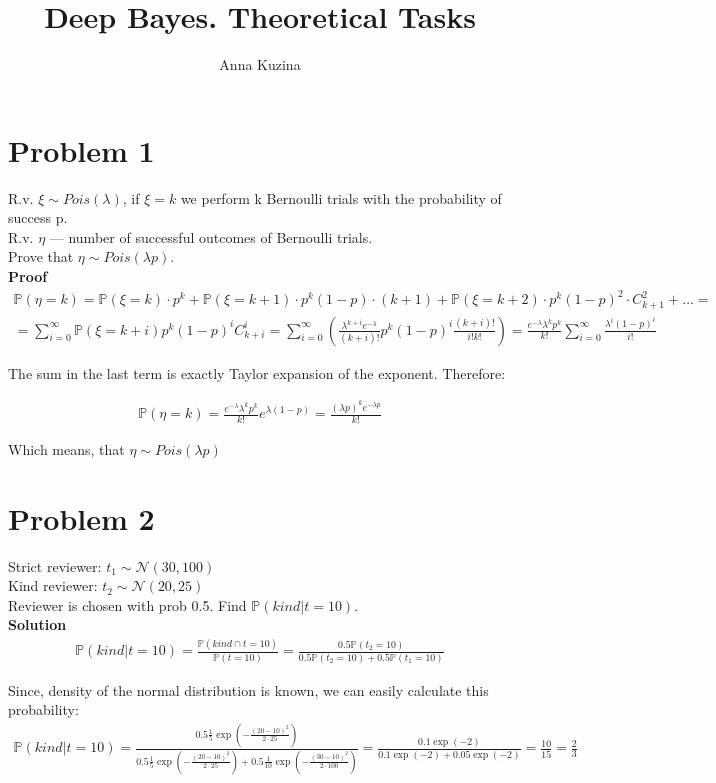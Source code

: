 \documentclass[]{article}
\title{Deep Bayes. Theoretical Tasks}
\author{Anna Kuzina}
\begin{document}
\maketitle



\section*{Problem 1}
R.v. $\xi \sim Pois(\lambda)$, if $\xi = k $ we perform k Bernoulli trials with the probability of success p. \\
R.v. $\eta$ ---  number of successful outcomes of Bernoulli trials.\\
Prove that $\eta \sim Pois(\lambda p)$.\\

\textbf{Proof}\\
\begin{align*}
\mathbb{P}(\eta = k) = \mathbb{P}(\xi = k)\cdot p^k + \mathbb{P}(\xi = k+1)\cdot p^{k}(1-p)\cdot (k+1) + \mathbb{P}(\xi = k+2)\cdot  p^{k}(1-p)^2\cdot C_{k+1}^2 + \dots =\\
=\sum_{i=0}^{\infty} \mathbb{P}(\xi = k+i) p^k (1-p)^{i}  C_{k+i}^i = 
\sum_{i=0}^{\infty}\left(   \frac{\lambda^{k+i}e^{-\lambda}}{(k+i)!}  p^k  (1-p)^{i}  \frac{(k+i)!}{i! k!}  \right)= 
\frac{e^{-\lambda}\lambda^k p^k}{k!}  \sum_{i=0}^{\infty}  \frac{\lambda^i (1-p)^i}{i!}
\end{align*}

The sum in the last term is exactly Taylor expansion of the exponent. Therefore:

\begin{align*}
\mathbb{P}(\eta = k) = \frac{e^{-\lambda}\lambda^k p^k}{k!}  e^{\lambda(1-p)} = 
\frac{(\lambda p)^k e^{-\lambda p}}{k!}
\end{align*}

Which means, that $\eta \sim Pois(\lambda p)$

\section*{Problem 2}
Strict reviewer: $t_1 \sim \mathcal{N}(30, 100)$\\
Kind reviewer:  $t_2 \sim \mathcal{N}(20, 25)$\\
Reviewer is chosen with prob 0.5.
Find $\mathbb{P}(kind | t = 10)$.\\

\textbf{Solution}
\begin{align*}
\mathbb{P} (kind | t = 10) = \frac{\mathbb{P} (kind \cap t = 10)}{\mathbb{P} (t = 10)} = \frac{0.5 \mathbb{P}(t_2 = 10) }{0.5 \mathbb{P} (t_2 = 10) + 0.5 \mathbb{P} (t_1 = 10)}
\end{align*}

Since, density of the normal distribution is known, we can easily calculate this probability:
\begin{align*}
\mathbb{P} (kind | t = 10) = \frac{0.5 \frac15 \exp(-\frac{(20 - 10)^2}{2\cdot 25})}{0.5 \frac15 \exp(-\frac{(20 - 10)^2}{2\cdot 25}) + 0.5 \frac{1}{10} \exp(-\frac{(30 - 10)^2}{2\cdot 100})} = \frac{0.1 \exp(-2)}{0.1 \exp(-2) + 0.05\exp(-2)} = \frac{10}{15} = \frac23
\end{align*}
\end{document}
